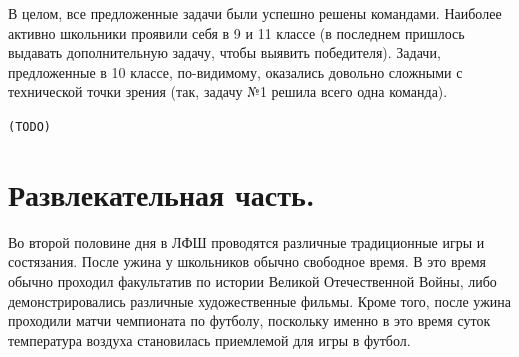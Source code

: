 \documentclass[12pt,a4paper,oneside,draft]{scrartcl}
\newlength{\h}
\newlength{\x}
\newcommand{\com}[1]{{\Large{\texttt{{\color{red}(#1)}}}}}
\begin{document}
В целом, все предложенные задачи были успешно решены
командами. Наиболее активно школьники проявили себя в 9 и 11 классе (в
последнем пришлось выдавать дополнительную задачу, чтобы выявить
победителя). Задачи, предложенные в 10 классе, по-видимому, оказались
довольно сложными с технической точки зрения (так, задачу №1 решила
всего одна команда). 

\com{TODO}

\section{Развлекательная часть.}
\label{sec:fun}

Во второй половине дня в ЛФШ проводятся различные традиционные игры и
состязания. После ужина у школьников обычно свободное время. В это
время обычно проходил факультатив по истории Великой Отечественной
Войны, либо демонстрировались различные художественные фильмы. Кроме
того, после ужина проходили матчи чемпионата по футболу, поскольку
именно в это время суток температура воздуха становилась приемлемой
для игры в футбол.
\end{document}
